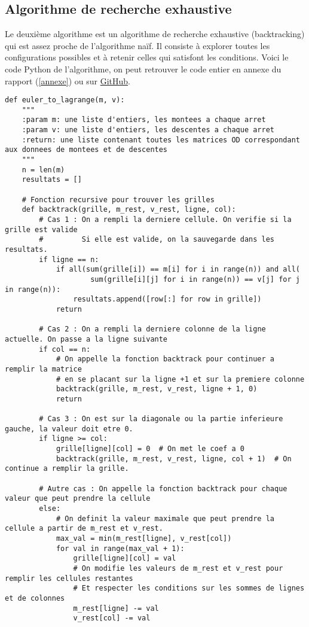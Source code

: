 \documentclass[12pt]{article}
\begin{document}
\subsection{Algorithme de recherche exhaustive}
Le deuxième algorithme est un algorithme de recherche exhaustive (backtracking) qui est assez proche de l'algorithme naïf. Il consiste à explorer toutes les configurations possibles et à retenir celles qui satisfont les conditions. Voici le code Python de l'algorithme, on peut retrouver le code entier en annexe du rapport (\ref{annexe}) ou sur \href{https://github.com/GaryTheCaptn/graphes_stage}{GitHub}.
\begin{lstlisting}
def euler_to_lagrange(m, v):
    """
    :param m: une liste d'entiers, les montees a chaque arret
    :param v: une liste d'entiers, les descentes a chaque arret
    :return: une liste contenant toutes les matrices OD correspondant aux donnees de montees et de descentes
    """
    n = len(m)
    resultats = []

    # Fonction recursive pour trouver les grilles
    def backtrack(grille, m_rest, v_rest, ligne, col):
        # Cas 1 : On a rempli la derniere cellule. On verifie si la grille est valide
        #         Si elle est valide, on la sauvegarde dans les resultats.
        if ligne == n:
            if all(sum(grille[i]) == m[i] for i in range(n)) and all(
                    sum(grille[i][j] for i in range(n)) == v[j] for j in range(n)):
                resultats.append([row[:] for row in grille])
            return

        # Cas 2 : On a rempli la derniere colonne de la ligne actuelle. On passe a la ligne suivante
        if col == n:
            # On appelle la fonction backtrack pour continuer a remplir la matrice
            # en se placant sur la ligne +1 et sur la premiere colonne
            backtrack(grille, m_rest, v_rest, ligne + 1, 0)
            return

        # Cas 3 : On est sur la diagonale ou la partie inferieure gauche, la valeur doit etre 0.
        if ligne >= col:
            grille[ligne][col] = 0  # On met le coef a 0
            backtrack(grille, m_rest, v_rest, ligne, col + 1)  # On continue a remplir la grille.

        # Autre cas : On appelle la fonction backtrack pour chaque valeur que peut prendre la cellule
        else:
            # On definit la valeur maximale que peut prendre la cellule a partir de m_rest et v_rest.
            max_val = min(m_rest[ligne], v_rest[col])
            for val in range(max_val + 1):
                grille[ligne][col] = val
                # On modifie les valeurs de m_rest et v_rest pour remplir les cellules restantes
                # Et respecter les conditions sur les sommes de lignes et de colonnes
                m_rest[ligne] -= val
                v_rest[col] -= val


\end{lstlisting}
\end{document}
